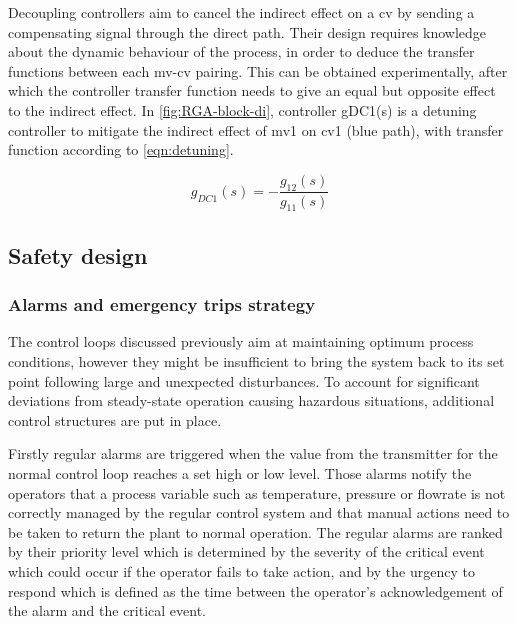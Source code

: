 Decoupling controllers aim to cancel the indirect effect on a cv by sending a compensating signal through the direct path. Their design requires knowledge about the dynamic behaviour of the process, in order to deduce the transfer functions between each mv-cv pairing. This can be obtained experimentally, after which the controller transfer function needs to give an equal but opposite effect to the indirect effect. In \cref{fig:RGA-block-di}, controller gDC1(s) is a detuning controller to mitigate the indirect effect of mv1 on cv1 (blue path), with transfer function according to \cref{eqn:detuning}.

\begin{equation}
\label{eqn:detuning}
g_{DC1}(s)=-\frac{g_{12}(s)}{g_{11}(s)}
\end{equation}

\subsection{Safety design} %

\subsubsection{Alarms and emergency trips strategy}
The control loops discussed previously aim at maintaining optimum process conditions, however they might be insufficient to bring the system back to its set point following large and unexpected disturbances. To account for significant deviations from steady-state operation causing hazardous situations, additional control structures are put in place.  

Firstly regular alarms are triggered when the value from the transmitter for the normal control loop reaches a set high or low level. Those alarms notify the operators that a process variable such as temperature, pressure or flowrate is not correctly managed by the regular control system and that manual actions need to be taken to return the plant to normal operation. The regular alarms are ranked by their priority level which is determined by the severity of the critical event which could occur if the operator fails to take action, and by the urgency to respond which is defined as the time between the operator's acknowledgement of the alarm and the critical event. 

